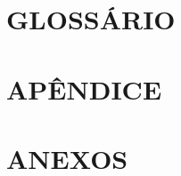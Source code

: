 \documentclass[
	10pt,				%
	openany,
    twoside,			%
	a4paper,			%
    chapter={TITLE},
    section={TITLE},
    subsection={TITLE},
    subsubsection={TITLE},
	english,			%
	french,				%
	spanish,			%
	brazil,				%
	sumario=tradicional
]{abntex2}
\begin{document}


\nocite{attili:24, abdulhussein:20, dockens:18, jain:24, li:22, wang:24,
        lobo-neto:24, kamble:25, varshini:25, lia:25, myagila:25,
        navendu:24, velmathi:23, silva-libras:25, gueuwou:25, grossi:24,
        perdigoto:24, silva-embarcado:24, anithadevi:25, oudah:20, sahoo:19,
        islam:19, saud:25, maia:25, costa-i3d:25, costa-slr:25, sousa:25,
        silva-ia:25, silva-conexao:24, alves:24, fanucchi:24, hamidullah:25,
        mdpi:25, scitepress:25}



\newpage
    \chapter*{GLOSSÁRIO}
    

    \chapter*{APÊNDICE}
    

    \chapter*{ANEXOS}
    
\end{document}
